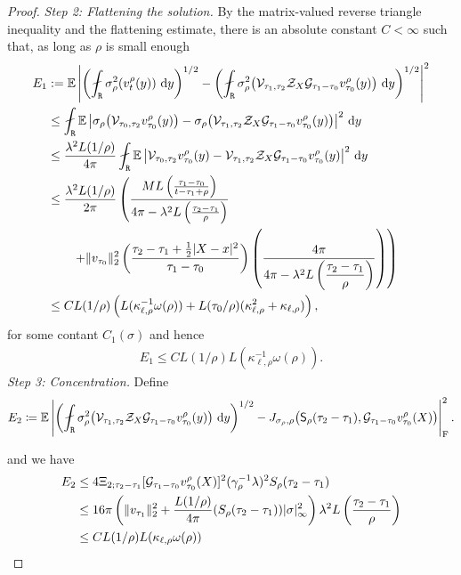 \begin{proof}
\medskip
\noindent\textit{Step 2: Flattening the solution.}
By the matrix-valued reverse triangle inequality and the flattening estimate,
there is an absolute constant
$C<\infty$ such that, as long as $\rho$ is small enough
\begin{align*}
E_1
&:= \EE\left\lvert
\left(\fint_{\ttR}\sigma_{\rho}^2(v^{\rho}_t(y))\,\dif y\right)^{1/2}
-\left(\fint_{\ttR} \sigma_{\rho}^2\!\left(
\clV_{\tau_1,\tau_2}\clZ_X\clG_{\tau_1-\tau_0}v^{\rho}_{\tau_0}(y)
\right)\,\dif y\right)^{1/2}
\right\rvert^{2}
\\
&\leq \fint_{\ttR}\EE\left\lvert
\sigma_{\rho}\!\left(\clV_{\tau_0,\tau_2}v^{\rho}_{\tau_0}(y)\right)
-\sigma_{\rho}\!\left(
\clV_{\tau_1,\tau_2}\clZ_X\clG_{\tau_1-\tau_0}v^{\rho}_{\tau_0}(y)
\right)
\right\rvert^{2}\,\dif y
\\&\leq \dfrac{\lambda^2L(1/\rho)}{4\pi}\fint_{\ttR}\EE\left\lvert
\clV_{\tau_0,\tau_2}v^{\rho}_{\tau_0}(y)
-\clV_{\tau_1,\tau_2}\clZ_X\clG_{\tau_1-\tau_0}v^{\rho}_{\tau_0}(y)
\right\rvert^{2}\,\dif y
\\
&\leq \dfrac{\lambda^2L(1/\rho)}{2\pi}\left(
\dfrac{ML\left(
\frac{\tau_1-\tau_0}
{t-\tau_1+\rho}
\right)}{4\pi - \lambda^2 L\left(\frac{\tau_2-\tau_1}{\rho}\right)}\right.
\\ &\left.\qquad +\|v_{\tau_0}\|_2^2\left(
\frac{
\tau_2-\tau_1+\frac12|X-x|^2
}{
\tau_1-\tau_0
}\right)
\left(\dfrac{4\pi}{4\pi - \lambda^2 L\left(\dfrac{\tau_2-\tau_1}{\rho}\right)}\right)
\right)
\\
&\leq CL(1/\rho)\left(L(\kappa_{\ell,\rho}^{-1}\omega(\rho)) + L(\tau_0/\rho)(\kappa_{\ell,\rho}^2 + \kappa_{\ell,\rho})\right),
\end{align*}
for some contant $C_1(\sigma)$ and hence
\begin{align*}
E_1 \leq CL(1/\rho)L(\kappa_{\ell,\rho}^{-1}\omega(\rho)) .
\end{align*}
\medskip
\noindent\textit{Step 3: Concentration.}
Define
\[
E_2\coloneqq\EE\left\lvert
\left(\fint_{\ttR}\sigma_{\rho}^2\!\left(
\clV_{\tau_1,\tau_2}\clZ_X\clG_{\tau_1-\tau_0}v^{\rho}_{\tau_0}(y)
\right)\,\dif y\right)^{1/2}
-J_{\sigma_{\rho},\rho}\!\left(
\sfS_\rho(\tau_2-\tau_1),
\clG_{\tau_1-\tau_0}v^{\rho}_{\tau_0}(X)
\right)
\right\rvert_{\Frob}^{2}.
\]

and we have
\[
\begin{aligned}
E_2 &\leq 4\Xi_{2;\tau_2-\tau_1}[\mathcal{G}_{\tau_1-\tau_0}v^{\rho}_{\tau_0}(X)]^2(\gamma_{\rho}^{-1}\lambda)^2S_{\rho}(\tau_2-\tau_1)  \\
& \leq 16\pi\left(\lVert v_{\tau_1}\rVert_2^2 + \dfrac{L(1/\rho)}{4\pi}(S_{\rho}(\tau_2-\tau_1))|\sigma|_{\infty}^2\right)\lambda^2 L\left(\dfrac{\tau_2-\tau_1}{\rho}\right) \\
&\leq CL(1/\rho)L(\kappa_{\ell,\rho}\omega(\rho))
\end{aligned}
\]


\end{proof}
